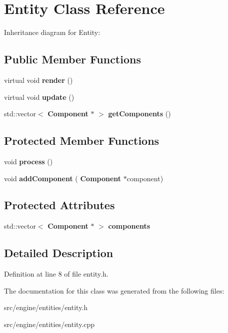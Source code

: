\section{Entity Class Reference}
\label{class_entity}


Inheritance diagram for Entity\+:
\subsection*{Public Member Functions}
\begin{DoxyCompactItemize}
\item 
\mbox{\label{class_entity_a01c46243d7385ce65d38268331cf278a}} 
virtual void {\bfseries render} ()
\item 
\mbox{\label{class_entity_aed73e98b980b85833428c935cc1c69f8}} 
virtual void {\bfseries update} ()
\item 
\mbox{\label{class_entity_a4a93e23f825bd2e6bfc0ea328738c27e}} 
std\+::vector$<$ \textbf{ Component} $\ast$ $>$ {\bfseries get\+Components} ()
\end{DoxyCompactItemize}
\subsection*{Protected Member Functions}
\begin{DoxyCompactItemize}
\item 
\mbox{\label{class_entity_a5a85a56abc8731c008b733cbc91dbb01}} 
void {\bfseries process} ()
\item 
\mbox{\label{class_entity_a70a722ddce08d51de0605965597bc69e}} 
void {\bfseries add\+Component} (\textbf{ Component} $\ast$component)
\end{DoxyCompactItemize}
\subsection*{Protected Attributes}
\begin{DoxyCompactItemize}
\item 
\mbox{\label{class_entity_a5638ab4924c1a8b697ceb53e30863ebe}} 
std\+::vector$<$ \textbf{ Component} $\ast$ $>$ {\bfseries components}
\end{DoxyCompactItemize}


\subsection{Detailed Description}


Definition at line 8 of file entity.\+h.



The documentation for this class was generated from the following files\+:\begin{DoxyCompactItemize}
\item 
src/engine/entities/entity.\+h\item 
src/engine/entities/entity.\+cpp\end{DoxyCompactItemize}
